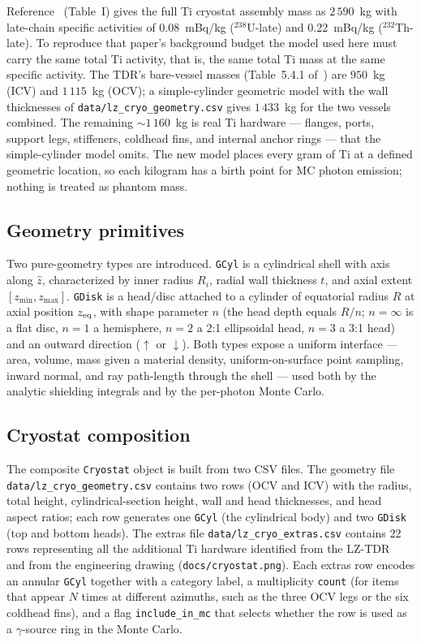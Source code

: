 \documentclass[11pt,a4paper]{article}
\begin{document}
Reference~\cite{LZ-bbonu} (Table~I) gives the full Ti cryostat
assembly mass as $2\,590$~kg with late-chain specific activities
of 0.08~mBq/kg ($^{238}$U-late) and 0.22~mBq/kg
($^{232}$Th-late). To reproduce that paper's background budget
the model used here must carry the same total Ti activity, that
is, the same total Ti mass at the same specific activity. The
TDR's bare-vessel masses (Table~5.4.1 of~\cite{LZ-TDR}) are
$950$~kg (ICV) and $1\,115$~kg (OCV); a simple-cylinder
geometric model with the wall thicknesses of
\texttt{data/lz\_cryo\_geometry.csv} gives $1\,433$~kg for the two
vessels combined. The remaining $\sim 1\,160$~kg is real Ti
hardware --- flanges, ports, support legs, stiffeners, coldhead
fins, and internal anchor rings --- that the simple-cylinder
model omits. The new model places every gram of Ti at a defined
geometric location, so each kilogram has a birth point for MC
photon emission; nothing is treated as phantom mass.

\subsection{Geometry primitives}

Two pure-geometry types are introduced. \texttt{GCyl} is a
cylindrical shell with axis along $\hat{z}$, characterized by
inner radius $R_i$, radial wall thickness $t$, and axial extent
$[z_{\min}, z_{\max}]$. \texttt{GDisk} is a head/disc attached to
a cylinder of equatorial radius $R$ at axial position $z_{\rm
eq}$, with shape parameter $n$ (the head depth equals $R/n$;
$n = \infty$ is a flat disc, $n = 1$ a hemisphere, $n = 2$ a 2:1
ellipsoidal head, $n = 3$ a 3:1 head) and an outward direction
($\uparrow$ or $\downarrow$). Both types expose a uniform
interface --- area, volume, mass given a material density,
uniform-on-surface point sampling, inward normal, and ray
path-length through the shell --- used both by the analytic
shielding integrals and by the per-photon Monte Carlo.

\subsection{Cryostat composition}

The composite \texttt{Cryostat} object is built from two CSV
files. The geometry file
\texttt{data/lz\_cryo\_geometry.csv} contains two rows (OCV and
ICV) with the radius, total height, cylindrical-section height,
wall and head thicknesses, and head aspect ratios; each row
generates one \texttt{GCyl} (the cylindrical body) and two
\texttt{GDisk} (top and bottom heads). The extras file
\texttt{data/lz\_cryo\_extras.csv} contains 22 rows representing
all the additional Ti hardware identified from the
LZ-TDR~\cite{LZ-TDR} and from the engineering drawing
(\texttt{docs/cryostat.png}). Each extras row encodes an annular
\texttt{GCyl} together with a category label, a multiplicity
\texttt{count} (for items that appear $N$ times at different
azimuths, such as the three OCV legs or the six coldhead fins),
and a flag \texttt{include\_in\_mc} that selects whether the row
is used as a $\gamma$-source ring in the Monte Carlo.
\end{document}
